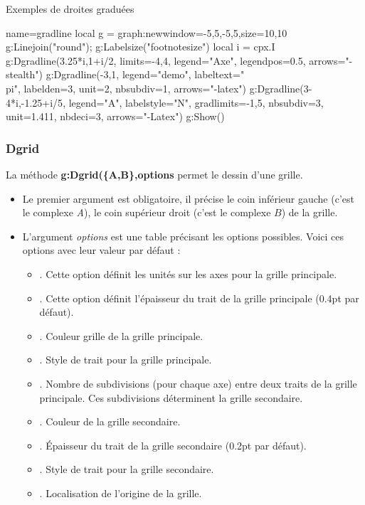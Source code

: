 \begin{demo}{Exemples de droites graduées}
\begin{luadraw}{name=gradline}
local g = graph:new{window={-5,5,-5,5},size={10,10}}
g:Linejoin("round"); g:Labelsize("footnotesize")
local i = cpx.I
g:Dgradline({3.25*i,1+i/2}, {limits={-4,4}, legend="Axe", legendpos=0.5, arrows="-stealth"})
g:Dgradline({-3,1}, {legend="demo", labeltext="\\pi", labelden=3, unit=2, nbsubdiv=1, arrows="-latex"})
g:Dgradline({3-4*i,-1.25+i/5}, {legend="A", labelstyle="N", gradlimits={-1,5}, nbsubdiv=3, unit=1.411, nbdeci=3, arrows="-Latex"})
g:Show()
\end{luadraw}
\end{demo}

\subsubsection{Dgrid}

La méthode \textbf{g:Dgrid(\{A,B\},options} permet le dessin d'une grille.
\begin{itemize}
    \item Le premier argument est obligatoire, il précise le coin inférieur gauche (c'est le complexe \emph{A}), le coin supérieur droit (c'est le complexe $B$) de la grille.
    \item L'argument \emph{options} est une table précisant les options possibles. Voici ces options avec leur valeur par défaut :
        \begin{itemize}
            \item {}. Cette option définit les unités sur les axes pour la grille principale.
            \item {}. Cette option définit l'épaisseur du trait de la grille principale (0.4pt par défaut).
            \item {}. Couleur grille de la grille principale.
            \item {}. Style de trait pour la grille principale.
            \item {}. Nombre de subdivisions (pour chaque axe) entre deux traits de la grille principale. Ces subdivisions déterminent la grille secondaire.
            \item {}. Couleur de la grille secondaire.
            \item {}. Épaisseur du trait de la grille secondaire (0.2pt par défaut).
            \item {}. Style de trait pour la grille secondaire.
            \item {}. Localisation de l'origine de la grille.
        \end{itemize}
\end{itemize}

